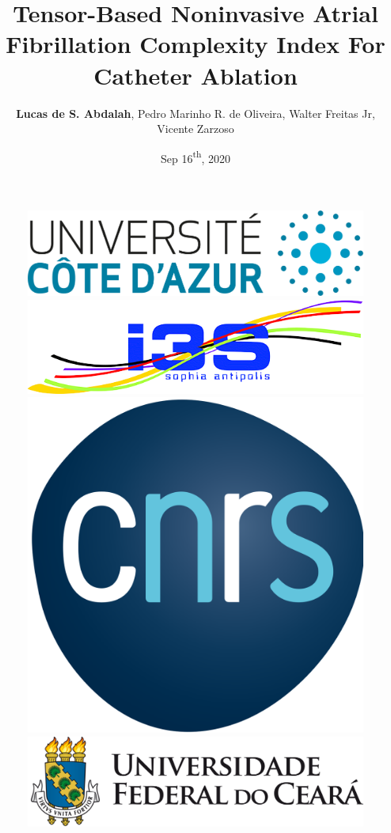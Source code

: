 \documentclass{beamer}
\title[CinC 2020]{Tensor-Based Noninvasive Atrial Fibrillation Complexity Index For Catheter Ablation}
\author[Lucas de S. Abdalah]{\textbf{Lucas de S. Abdalah}, Pedro Marinho R. de Oliveira, Walter Freitas Jr,\\Vicente Zarzoso}
\date{Sep 16{\textsuperscript{th}}, 2020}
\begin{document}
	\begin{frame}
		\begin{figure}[!htb]
			\centering
			\includegraphics[scale=0.055]{UCA_logo} \includegraphics[scale=0.150]{I3S_logo} \includegraphics[scale=0.025]{CNRS_logo.png} \includegraphics[scale=0.130]{UFC_logo.png}
		\end{figure}
		\vspace{-0.4cm}

		\titlepage
	\end{frame}
\end{document}
